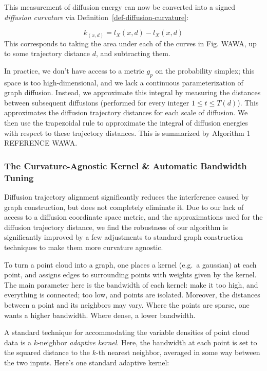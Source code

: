 \documentclass[
  letterpaper,
  DIV=11,
  numbers=noendperiod]{scrartcl}
\theoremstyle{plain}
\theoremstyle{plain}
\theoremstyle{definition}
\theoremstyle{plain}
\theoremstyle{definition}
\theoremstyle{plain}
\theoremstyle{remark}
\begin{document}
This measurement of diffusion energy can now be converted into a signed
\emph{diffusion curvature} via Definition~\ref{def-diffusion-curvature}:

\[
k_(x, d) = l_{X}(x, d) - l_{X}(x, d)
\] This corresponds to taking the area under each of the curves in Fig.
WAWA, up to some trajectory distance \(d\), and subtracting them.

In practice, we don't have access to a metric \(g_{p}\) on the
probability simplex; this space is too high-dimensional, and we lack a
continuous parameterization of graph diffusion. Instead, we approximate
this integral by measuring the distances between subsequent diffusions
(performed for every integer \(1 \leq t \leq T(d)\)). This approximates
the diffusion trajectory distances for each scale of diffusion. We then
use the trapezoidal rule to approximate the integral of diffusion
energies with respect to these trajectory distances. This is summarized
by Algorithm 1 REFERENCE WAWA.

\subsubsection{The Curvature-Agnostic Kernel \& Automatic Bandwidth
Tuning}\label{the-curvature-agnostic-kernel-automatic-bandwidth-tuning}

Diffusion trajectory alignment significantly reduces the interference
caused by graph construction, but does not completely eliminate it. Due
to our lack of access to a diffusion coordinate space metric, and the
approximations used for the diffusion trajectory distance, we find the
robustness of our algorithm is significantly improved by a few
adjustments to standard graph construction techniques to make them more
curvature agnostic.

To turn a point cloud into a graph, one places a kernel (e.g.~a
gaussian) at each point, and assigns edges to surrounding points with
weights given by the kernel. The main parameter here is the bandwidth of
each kernel: make it too high, and everything is connected; too low, and
points are isolated. Moreover, the distances between a point and its
neighbors may vary. Where the points are sparse, one wants a higher
bandwidth. Where dense, a lower bandwidth.

A standard technique for accommodating the variable densities of point
cloud data is a \(k\)-neighbor \emph{adaptive kernel}. Here, the
bandwidth at each point is set to the squared distance to the \(k\)-th
nearest neighbor, averaged in some way between the two inputs. Here's
one standard adaptive kernel:
\end{document}

